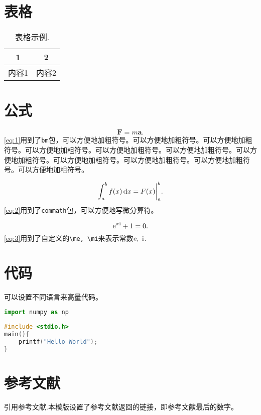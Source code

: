 \section{表格}


\begin{table}[htp]
   \centering
   \caption{表格示例.}
   \begin{tabular}{cc}
	  \toprule  1 & 2     \\
	  \midrule
	  内容1       & 内容2 \\
	  \bottomrule
   \end{tabular}
   \label{tab:1}
\end{table}

\section{公式}


\begin{equation}
   \bm{F} = m\bm{a}.
   \label{eq:1}
\end{equation}
\cref{eq:1}用到了\texttt{bm}包，可以方便地加粗符号。可以方便地加粗符号。可以方便地加粗符号。可以方便地加粗符号。可以方便地加粗符号。可以方便地加粗符号。可以方便地加粗符号。可以方便地加粗符号。可以方便地加粗符号。可以方便地加粗符号。可以方便地加粗符号。

\begin{equation}
   \int^b_a f(x) \dif x=F(x)\bigg|^b_a.
   \label{eq:2}
\end{equation}
\cref{eq:2}用到了\texttt{commath}包，可以方便地写微分算符。

\begin{equation}
   \mathrm{e} ^{\pi \mathrm{i}} + 1 = 0.
   \label{eq:3}
\end{equation}
\cref{eq:3}用到了自定义的\verb"\me, \mi"来表示常数$\mathrm{e},\ \mathrm{i}$.

\section{代码}

可以设置不同语言来高量代码。

\begin{lstlisting}[language=python]
import numpy as np
\end{lstlisting}

\begin{lstlisting}[language=c]
#include <stdio.h>
main(){
	printf("Hello World");
}
\end{lstlisting}

\section{参考文献}

引用参考文献.本模版设置了参考文献返回的链接，即参考文献最后的数字。

